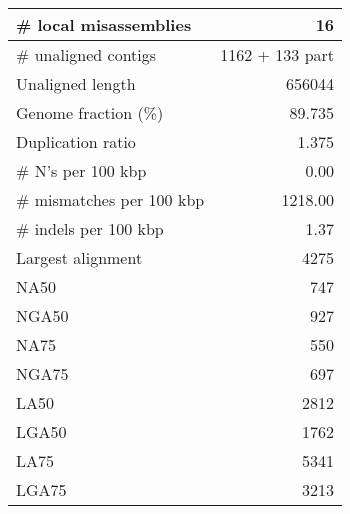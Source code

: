 \documentclass[12pt,a4paper]{article}
\begin{document}
\begin{table}[ht]
\begin{center}
\begin{tabular}{|l*{1}{|r}|}
\# local misassemblies & 16 \\ \hline
\# unaligned contigs & 1162 + 133 part \\ \hline
Unaligned length & 656044 \\ \hline
Genome fraction (\%) & 89.735 \\ \hline
Duplication ratio & 1.375 \\ \hline
\# N's per 100 kbp & 0.00 \\ \hline
\# mismatches per 100 kbp & 1218.00 \\ \hline
\# indels per 100 kbp & 1.37 \\ \hline
Largest alignment & 4275 \\ \hline
NA50 & 747 \\ \hline
NGA50 & 927 \\ \hline
NA75 & 550 \\ \hline
NGA75 & 697 \\ \hline
LA50 & 2812 \\ \hline
LGA50 & 1762 \\ \hline
LA75 & 5341 \\ \hline
LGA75 & 3213 \\ \hline
\end{tabular}
\end{center}
\end{table}
\end{document}

